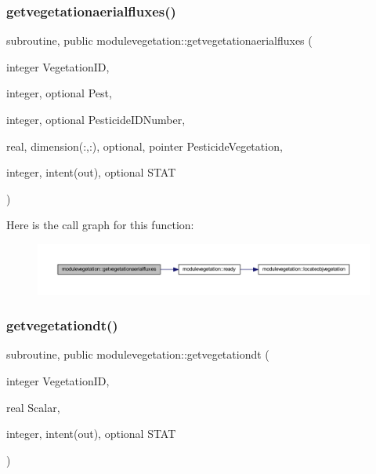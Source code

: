 \subsubsection{\texorpdfstring{getvegetationaerialfluxes()}{getvegetationaerialfluxes()}}
{\footnotesize\ttfamily subroutine, public modulevegetation\+::getvegetationaerialfluxes (\begin{DoxyParamCaption}\item[{integer}]{Vegetation\+ID,  }\item[{integer, optional}]{Pest,  }\item[{integer, optional}]{Pesticide\+I\+D\+Number,  }\item[{real, dimension(\+:,\+:), optional, pointer}]{Pesticide\+Vegetation,  }\item[{integer, intent(out), optional}]{S\+T\+AT }\end{DoxyParamCaption})}

Here is the call graph for this function\+:\nopagebreak
\begin{figure}[H]
\begin{center}
\leavevmode
\includegraphics[width=350pt]{namespacemodulevegetation_a2c86b41a4e32d9f80ab445ee7695a777_cgraph}
\end{center}
\end{figure}
\mbox{\label{namespacemodulevegetation_a357b84bec55907c71de65f8c878020f2}} 
\subsubsection{\texorpdfstring{getvegetationdt()}{getvegetationdt()}}
{\footnotesize\ttfamily subroutine, public modulevegetation\+::getvegetationdt (\begin{DoxyParamCaption}\item[{integer}]{Vegetation\+ID,  }\item[{real}]{Scalar,  }\item[{integer, intent(out), optional}]{S\+T\+AT }\end{DoxyParamCaption})}

